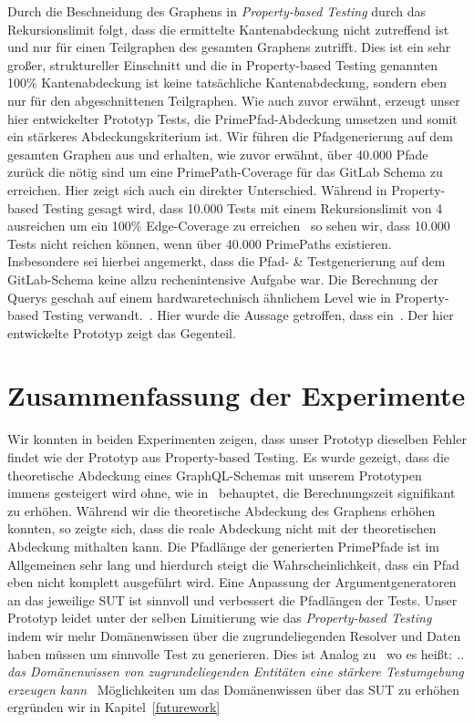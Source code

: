 Durch die Beschneidung des Graphens in \textit{Property-based Testing} durch das Rekursionslimit folgt, dass die ermittelte Kantenabdeckung
nicht zutreffend ist und nur für einen Teilgraphen des gesamten Graphens zutrifft.
Dies ist ein sehr großer, struktureller Einschnitt und die in Property-based Testing genannten 100\% Kantenabdeckung ist keine tatsächliche Kantenabdeckung,
sondern eben nur für den abgeschnittenen Teilgraphen.
Wie auch zuvor erwähnt, erzeugt unser hier entwickelter Prototyp Tests, die PrimePfad-Abdeckung umsetzen und somit ein stärkeres Abdeckungskriterium ist.
Wir führen die Pfadgenerierung auf dem gesamten Graphen aus und erhalten, wie zuvor erwähnt, über 40.000 Pfade zurück die nötig sind um eine PrimePath-Coverage für das GitLab Schema zu erreichen.
Hier zeigt sich auch ein direkter Unterschied.
Während in Property-based Testing gesagt wird, dass 10.000 Tests mit einem Rekursionslimit von 4 ausreichen um ein 100\% Edge-Coverage zu erreichen~\cite[vgl. Table 1]{property-based-testing}
so sehen wir, dass 10.000 Tests nicht reichen können, wenn über 40.000 PrimePaths existieren.
Insbesondere sei hierbei angemerkt, dass die Pfad- \& Testgenerierung auf dem GitLab-Schema keine allzu rechenintensive Aufgabe war.
Die Berechnung der Querys geschah auf einem hardwaretechnisch ähnlichem Level wie in Property-based Testing verwandt.~\cite[vgl. Experimental Setup]{property-based-testing}.
Hier wurde die Aussage getroffen, dass ein~\cite[Tiefensuchen Ansatz nicht skaliert und deswegen ein iterativer Ansatz zu präferieren ist]{property-based-testing}.
Der hier entwickelte Prototyp zeigt das Gegenteil.

\section{Zusammenfassung der Experimente}

Wir konnten in beiden Experimenten zeigen, dass unser Prototyp dieselben Fehler findet wie der Prototyp aus Property-based Testing.
Es wurde gezeigt, dass die theoretische Abdeckung eines GraphQL-Schemas mit unserem Prototypen immens gesteigert wird ohne,
wie in~\cite{property-based-testing} behauptet, die Berechnungszeit signifikant zu erhöhen.
Während wir die theoretische Abdeckung des Graphens erhöhen konnten, so zeigte sich, dass die reale Abdeckung nicht mit der
theoretischen Abdeckung mithalten kann.
Die Pfadlänge der generierten PrimePfade ist im Allgemeinen sehr lang und hierdurch steigt die Wahrscheinlichkeit, dass ein Pfad eben nicht komplett ausgeführt wird.
Eine Anpassung der Argumentgeneratoren an das jeweilige SUT ist sinnvoll und verbessert die Pfadlängen der Tests.
Unser Prototyp leidet unter der selben Limitierung wie das \textit{Property-based Testing} indem wir mehr Domänenwissen über die
zugrundeliegenden Resolver und Daten haben müssen um sinnvolle Test zu generieren.
Dies ist Analog zu~\cite{property-based-testing} wo es heißt: \textit{.. das Domänenwissen von zugrundeliegenden Entitäten eine stärkere Testumgebung erzeugen kann}~\cite[S.8]{property-based-testing}
Möglichkeiten um das Domänenwissen über das SUT zu erhöhen ergründen wir in Kapitel~\ref{futurework}